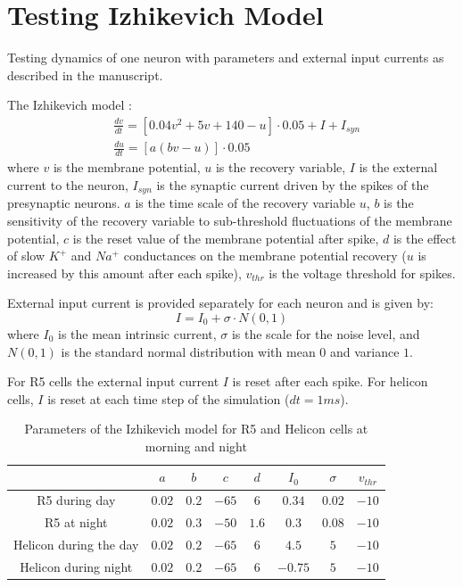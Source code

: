 \documentclass[../../report.tex]{subfiles}
\begin{document}
\section{Testing Izhikevich Model}

Testing dynamics of one neuron with parameters and external input currents as described in the manuscript.

The Izhikevich model \cite{Izhikevich_2003}:
\begin{align}\label{eq_izhikevich_model}
    & \frac{dv}{dt} = \left[ 0.04v^2 + 5v + 140 - u \right] \cdot 0.05 + I + I_{syn} \\
    & \frac{du}{dt} = \left[ a (bv - u) \right] \cdot 0.05
\end{align}
where $v$ is the membrane potential, $u$ is the recovery variable, $I$ is the external current to the neuron, $I_{syn}$ is the synaptic current driven by the spikes of the presynaptic neurons. $a$ is the time scale of the recovery variable $u$, $b$ is the sensitivity of the recovery variable to sub-threshold fluctuations of the membrane potential, $c$ is the reset value of the membrane potential after spike, $d$ is the effect of slow $K^+$ and $Na^+$ conductances on the membrane potential recovery ($u$ is increased by this amount after each spike), $v_{thr}$ is the voltage threshold for spikes.

External input current is provided separately for each neuron and is given by:
\begin{equation}\label{eq_external_input_current}
    I = I_0 + \sigma \cdot N(0,1)
\end{equation}
where $I_0$ is the mean intrinsic current, $\sigma$ is the scale for the noise level, and $N(0,1)$ is the standard normal distribution with mean $0$ and variance $1$.

For R5 cells the external input current $I$ is reset after each spike. For helicon cells, $I$ is reset at each time step of the simulation ($dt=1ms$).

\begin{table}[!h]
    \centering
    \begin{tabular}{|c||c|c|c|c|c|c|c|}
        \hline
         & $a$ & $b$ & $c$ & $d$ & $I_0$ & $\sigma$ & $v_{thr}$ \\
         \hline
         \hline
        R5 during day & $0.02$ & $0.2$ & $-65$ & $6$ & $0.34$ & $0.02$ & $-10$ \\
        \hline
        R5 at night & $0.02$ & $0.3$ & $-50$ & $1.6$ & $0.3$ & $0.08$ & $-10$ \\
        \hline
        Helicon during the day & $0.02$ & $0.2$ & $-65$ & $6$ & $4.5$ & $5$ & $-10$ \\
        \hline
        Helicon during night & $0.02$ & $0.2$ & $-65$ & $6$ & $-0.75$ & $5$ & $-10$ \\
        \hline
    \end{tabular}
    \caption{Parameters of the Izhikevich model for R5 and Helicon cells at morning and night}
    \label{tab:my_label}
\end{table}
\end{document}
